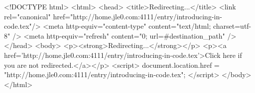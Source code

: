 <!DOCTYPE html>
<html>
<head>
<title>Redirecting...</title>
<link rel="canonical" href="http://home.jle0.com:4111/entry/introducing-in-code.tex"/>
<meta http-equiv="content-type" content="text/html; charset=utf-8" />
<meta http-equiv="refresh" content="0; url=#{destination_path}" />
</head>
<body>
  <p><strong>Redirecting...</strong></p>
  <p><a href='http://home.jle0.com:4111/entry/introducing-in-code.tex'>Click here if you are not redirected.</a></p>
  <script>
    document.location.href = "http://home.jle0.com:4111/entry/introducing-in-code.tex";
  </script>
</body>
</html>
